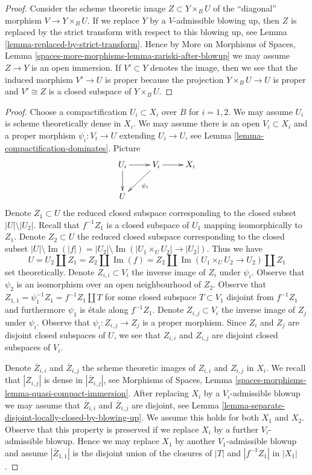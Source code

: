 \documentclass[10pt,a4paper]{amsart}
\theoremstyle{plain}
\theoremstyle{definition}
\theoremstyle{remark}
\numberwithin{equation}{subsection}
\def\Im{\mathop{\mathrm{Im}}}
\begin{document}
\begin{proof}
Consider the scheme theoretic image $Z \subset Y \times_B U$
of the ``diagonal'' morphism $V \to Y \times_B U$. If we replace
$Y$ by a $V$-admissible blowing up, then $Z$ is replaced by
the strict transform with respect to this blowing up, see
Lemma \ref{lemma-replaced-by-strict-transform}. Hence by
More on Morphisms of Spaces, Lemma
\ref{spaces-more-morphisms-lemma-zariski-after-blowup}
we may assume $Z \to Y$
is an open immersion. If $V' \subset Y$ denotes the image, then we
see that the induced morphism $V' \to U$ is proper because the
projection $Y \times_B U \to U$ is proper and $V' \cong Z$
is a closed subspace of $Y \times_B U$.
\end{proof}

\begin{proof}
Choose a compactification $U_i \subset X_i$ over $B$ for $i = 1, 2$. We may
assume $U_i$ is scheme theoretically dense in $X_i$. We may assume there
is an open $V_i \subset X_i$ and a proper morphism
$\psi_i : V_i \to U$ extending $U_i \to U$, see
Lemma \ref{lemma-compactification-dominates}. Picture
$$
\xymatrix{
U_i \ar[r] \ar[d] & V_i \ar[r] \ar[dl]^{\psi_i} & X_i \\
U
}
$$
Denote $Z_1 \subset U$ the reduced closed subspace corresponding
to the closed subset $|U| \setminus |U_2|$. Recall that $f^{-1}Z_1$
is a closed subspace of $U_1$ mapping isomorphically to $Z_1$.
Denote $Z_2 \subset U$ the reduced closed subspace corresponding
to the closed subset $|U| \setminus \Im(|f|) =
|U_2| \setminus \Im(|U_1 \times_U U_2| \to |U_2|)$.
Thus we have
$$
U = U_2 \amalg Z_1 = Z_2 \amalg \Im(f) =
Z_2 \amalg \Im(U_1 \times_U U_2 \to U_2) \amalg Z_1
$$
set theoretically. Denote $Z_{i, i} \subset V_i$ the inverse image of $Z_i$
under $\psi_i$. Observe that $\psi_2$ is an isomorphism over an open
neighbourhood of $Z_2$. Observe that
$Z_{1, 1} = \psi_1^{-1}Z_1 = f^{-1}Z_1 \amalg T$ for some
closed subspace $T \subset V_1$ disjoint from $f^{-1}Z_1$ and furthermore
$\psi_1$ is \'etale along $f^{-1}Z_1$.
Denote $Z_{i, j} \subset V_i$ the inverse image of $Z_j$ under $\psi_i$.
Observe that $\psi_i : Z_{i, j} \to Z_j$ is a proper morphism.
Since $Z_i$ and $Z_j$ are disjoint closed subspaces of $U$, we see that
$Z_{i, i}$ and $Z_{i, j}$ are disjoint closed subspaces of $V_i$.

\medskip\noindent
Denote $\overline{Z}_{i, i}$ and $\overline{Z}_{i, j}$ the
scheme theoretic images of $Z_{i, i}$ and $Z_{i, j}$ in $X_i$.
We recall that $|Z_{i, j}|$ is dense in $|\overline{Z}_{i, j}|$, see
Morphisms of Spaces, Lemma
\ref{spaces-morphisms-lemma-quasi-compact-immersion}.
After replacing $X_i$ by a $V_i$-admissible blowup we may assume that
$\overline{Z}_{i, i}$ and $\overline{Z}_{i, j}$ are disjoint, see
Lemma \ref{lemma-separate-disjoint-locally-closed-by-blowing-up}.
We assume this holds for both $X_1$ and $X_2$.
Observe that this property is preserved if we replace $X_i$
by a further $V_i$-admissible blowup. Hence we may replace $X_1$ by another
$V_1$-admissible blowup and assume $|\overline{Z}_{1, 1}|$
is the disjoint union of the closures of $|T|$ and $|f^{-1}Z_1|$ in $|X_1|$.


\end{proof}
\end{document}
